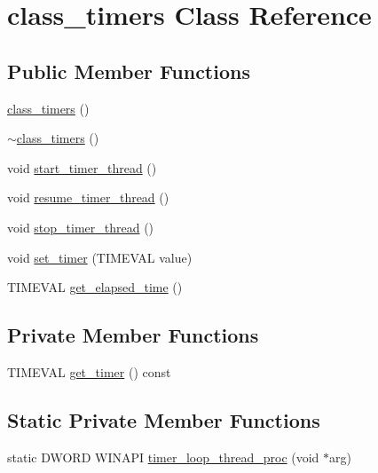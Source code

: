 \hypertarget{classclass__timers}{
\section{class\_\-timers Class Reference}
\label{classclass__timers}
}
\subsection*{Public Member Functions}
\begin{CompactItemize}
\item 
\hyperlink{classclass__timers_924a91ae96d721dd432136351c925d9f}{class\_\-timers} ()
\item 
\hyperlink{classclass__timers_6fd261041314ddd3ada9537530d02afd}{$\sim$class\_\-timers} ()
\item 
void \hyperlink{classclass__timers_d857a63670354f41759f68d4ea29a0f5}{start\_\-timer\_\-thread} ()
\item 
void \hyperlink{classclass__timers_e0066fac671c6adb997d6c075487af89}{resume\_\-timer\_\-thread} ()
\item 
void \hyperlink{classclass__timers_a78d9f5ab159ec6b11b4dc4c8f351697}{stop\_\-timer\_\-thread} ()
\item 
void \hyperlink{classclass__timers_a27df6346a38fb25acc394cb7998a3f8}{set\_\-timer} (TIMEVAL value)
\item 
TIMEVAL \hyperlink{classclass__timers_0fa5bd5d1d4012bf9eef3ffabe990dfb}{get\_\-elapsed\_\-time} ()
\end{CompactItemize}
\subsection*{Private Member Functions}
\begin{CompactItemize}
\item 
TIMEVAL \hyperlink{classclass__timers_e4fe19b5b56b72ce2601d74f6519bd0b}{get\_\-timer} () const
\end{CompactItemize}
\subsection*{Static Private Member Functions}
\begin{CompactItemize}
\item 
static DWORD WINAPI \hyperlink{classclass__timers_a68dd5b6225b3519b4bc2a0280683c87}{timer\_\-loop\_\-thread\_\-proc} (void $\ast$arg)
\end{CompactItemize}
